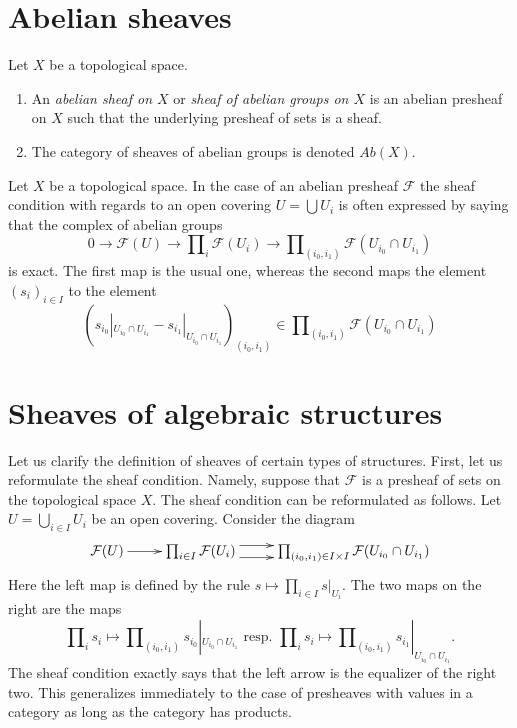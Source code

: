 \section{Abelian sheaves}
\label{section-abelian-sheaves}

\begin{definition}
\label{definition-abelian-sheaf}
Let $X$ be a topological space.
\begin{enumerate}
\item An {\it abelian sheaf on $X$} or
{\it sheaf of abelian groups on $X$}
is an abelian presheaf on $X$ such that the underlying presheaf of
sets is a sheaf.
\item The category of sheaves of abelian groups
is denoted $\textit{Ab}(X)$.
\end{enumerate}
\end{definition}

\noindent
Let $X$ be a topological space.
In the case of an abelian presheaf $\mathcal{F}$ the sheaf
condition with regards to an open covering $U = \bigcup U_i$
is often expressed by saying that the complex of abelian groups
$$
0 \to \mathcal{F}(U)
\to \prod\nolimits_i \mathcal{F}(U_i)
\to \prod\nolimits_{(i_0, i_1)} \mathcal{F}(U_{i_0} \cap U_{i_1})
$$
is exact. The first map is the usual one, whereas the second
maps the element $(s_i)_{i \in I}$ to the element
$$
(
s_{i_0}|_{U_{i_0} \cap U_{i_1}} -
s_{i_1}|_{U_{i_0} \cap U_{i_1}}
)_{(i_0, i_1)}
\in \prod\nolimits_{(i_0, i_1)} \mathcal{F}(U_{i_0} \cap U_{i_1})
$$

\section{Sheaves of algebraic structures}
\label{section-sheaves-structures}

\noindent
Let us clarify the definition of sheaves of certain types of structures.
First, let us reformulate the sheaf condition. Namely, suppose that
$\mathcal{F}$ is a presheaf of sets on the topological space $X$.
The sheaf condition can be reformulated as follows. Let
$U = \bigcup_{i\in I} U_i$ be an open covering. Consider the
diagram
$$
\xymatrix{
\mathcal{F}(U) \ar[r]
&
\prod\nolimits_{i\in I}
\mathcal{F}(U_i)
\ar@<1ex>[r] \ar@<-1ex>[r]
&
\prod\nolimits_{(i_0, i_1) \in I \times I}
\mathcal{F}(U_{i_0} \cap U_{i_1})
}
$$
Here the left map is defined by the rule
$s \mapsto \prod_{i \in I} s|_{U_i}$. The two maps
on the right are the maps
$$
\prod\nolimits_i s_i
\mapsto
\prod\nolimits_{(i_0, i_1)} s_{i_0}|_{U_{i_0} \cap U_{i_1}}
\text{ resp. }
\prod\nolimits_i s_i
\mapsto
\prod\nolimits_{(i_0, i_1)} s_{i_1}|_{U_{i_0} \cap U_{i_1}}.
$$
The sheaf condition exactly says that the left arrow
is the equalizer of the right two. This generalizes
immediately to the case of presheaves with values in a
category as long as the category has products.

